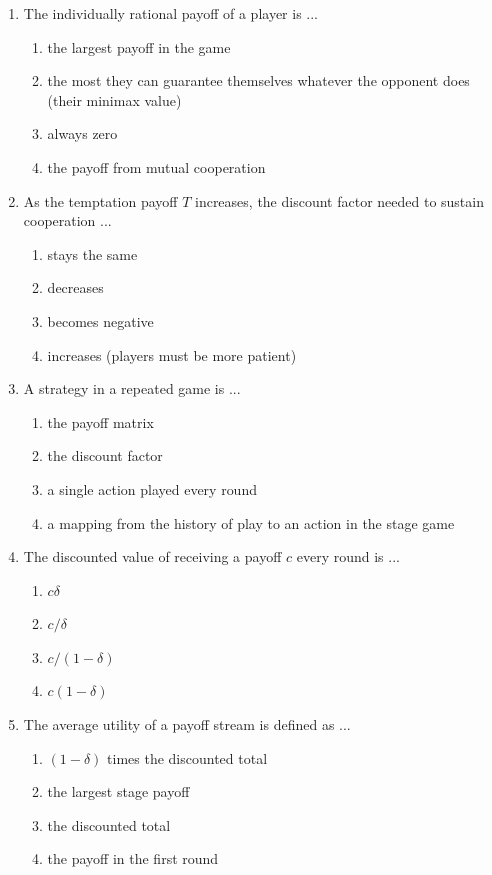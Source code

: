 \documentclass[11pt]{article}
\begin{document}
\begin{enumerate}[itemsep=6pt]
  \item The individually rational payoff of a player is ...
  \begin{enumerate}
    \item the largest payoff in the game
    \item the most they can guarantee themselves whatever the opponent does (their minimax value)
    \item always zero
    \item the payoff from mutual cooperation
  \end{enumerate}
  \item As the temptation payoff \(T\) increases, the discount factor needed to sustain cooperation ...
  \begin{enumerate}
    \item stays the same
    \item decreases
    \item becomes negative
    \item increases (players must be more patient)
  \end{enumerate}
  \item A strategy in a repeated game is ...
  \begin{enumerate}
    \item the payoff matrix
    \item the discount factor
    \item a single action played every round
    \item a mapping from the history of play to an action in the stage game
  \end{enumerate}
  \item The discounted value of receiving a payoff \(c\) every round is ...
  \begin{enumerate}
    \item \(c \delta\)
    \item \(c / \delta\)
    \item \(c / (1 - \delta)\)
    \item \(c (1 - \delta)\)
  \end{enumerate}
  \item The average utility of a payoff stream is defined as ...
  \begin{enumerate}
    \item \((1 - \delta)\) times the discounted total
    \item the largest stage payoff
    \item the discounted total
    \item the payoff in the first round

\end{enumerate}
\end{enumerate}
\end{document}
